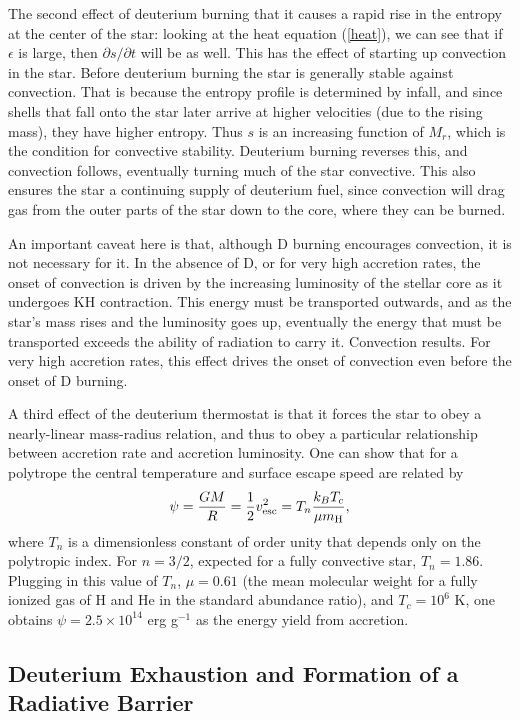The second effect of deuterium burning that it causes a rapid rise in the entropy at the center of the star: looking at the heat equation (\ref{heat}), we can see that if $\epsilon$ is large, then $\partial s/\partial t$ will be as well. This has the effect of starting up convection in the star. Before deuterium burning the star is generally stable against convection. That is because the entropy profile is determined by infall, and since shells that fall onto the star later arrive at higher velocities (due to the rising mass), they have higher entropy. Thus $s$ is an increasing function of $M_r$, which is the condition for convective stability. Deuterium burning reverses this, and convection follows, eventually turning much of the star convective. This also ensures the star a continuing supply of deuterium fuel, since convection will drag gas from the outer parts of the star down to the core, where they can be burned.

An important caveat here is that, although D burning encourages convection, it is not necessary for it. In the absence of D, or for very high accretion rates, the onset of convection is driven by the increasing luminosity of the stellar core as it undergoes KH contraction. This energy must be transported outwards, and as the star's mass rises and the luminosity goes up, eventually the energy that must be transported exceeds the ability of radiation to carry it. Convection results. For very high accretion rates, this effect drives the onset of convection even before the onset of D burning.

A third effect of the deuterium thermostat is that it forces the star to obey a nearly-linear mass-radius relation, and thus to obey a particular relationship between accretion rate and accretion luminosity. One can show that for a polytrope the central temperature and surface escape speed are related by
\begin{equation}
\psi = \frac{GM}{R} = \frac{1}{2}v_{\rm esc}^2 = T_n \frac{k_B T_c}{\mu m_{\rm H}},
\end{equation}
where $T_n$ is a dimensionless constant of order unity that depends only on the polytropic index. For $n=3/2$, expected for a fully convective star, $T_n = 1.86$. Plugging in this value of $T_n$, $\mu=0.61$ (the mean molecular weight for a fully ionized gas of H and He in the standard abundance ratio), and $T_c = 10^6$ K, one obtains $\psi = 2.5\times 10^{14}$ erg g$^{-1}$ as the energy yield from accretion.

\subsection{Deuterium Exhaustion and Formation of a Radiative Barrier}

